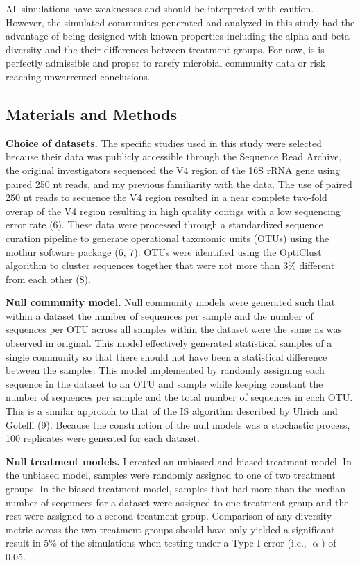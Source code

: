 \documentclass[
]{article}
\begin{document}
All simulations have weaknesses and should be interpreted with caution.
However, the simulated communites generated and analyzed in this study
had the advantage of being designed with known properties including the
alpha and beta diversity and the their differences between treatment
groups. For now, is is perfectly admissible and proper to rarefy
microbial community data or risk reaching unwarrented conclusions.

\hypertarget{materials-and-methods}{%
\subsection{Materials and Methods}\label{materials-and-methods}}

\textbf{Choice of datasets.} The specific studies used in this study
were selected because their data was publicly accessible through the
Sequence Read Archive, the original investigators sequenced the V4
region of the 16S rRNA gene using paired 250 nt reads, and my previous
familiarity with the data. The use of paired 250 nt reads to sequence
the V4 region resulted in a near complete two-fold overap of the V4
region resulting in high quality contigs with a low sequencing error
rate (6). These data were processed through a standardized sequence
curation pipeline to generate operational taxonomic units (OTUs) using
the mothur software package (6, 7). OTUs were identified using the
OptiClust algorithm to cluster sequences together that were not more
than 3\% different from each other (8).

\textbf{Null community model.} Null community models were generated such
that within a dataset the number of sequences per sample and the number
of sequences per OTU across all samples within the dataset were the same
as was observed in original. This model effectively generated
statistical samples of a single community so that there should not have
been a statistical difference between the samples. This model
implemented by randomly assigning each sequence in the dataset to an OTU
and sample while keeping constant the number of sequences per sample and
the total number of sequences in each OTU. This is a similar approach to
that of the IS algorithm described by Ulrich and Gotelli (9). Because
the construction of the null models was a stochastic process, 100
replicates were geneated for each dataset.

\textbf{Null treatment models.} I created an unbiased and biased
treatment model. In the unbiased model, samples were randomly assigned
to one of two treatment groups. In the biased treatment model, samples
that had more than the median number of seqeunces for a dataset were
assigned to one treatment group and the rest were assigned to a second
treatment group. Comparison of any diversity metric across the two
treatment groups should have only yielded a significant result in 5\% of
the simulations when testing under a Type I error (i.e., \(\upalpha\))
of 0.05.
\end{document}
